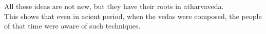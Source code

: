 \documentclass{article}
\begin{document}
    All these ideas are not new, but they have their roots in atharvaveda. \\
    This shows that even in acient period, when the vedas were composed, the people of that time were aware of such techniques.\cite{atharvaveda}
    
    
   
    
\end{document}
